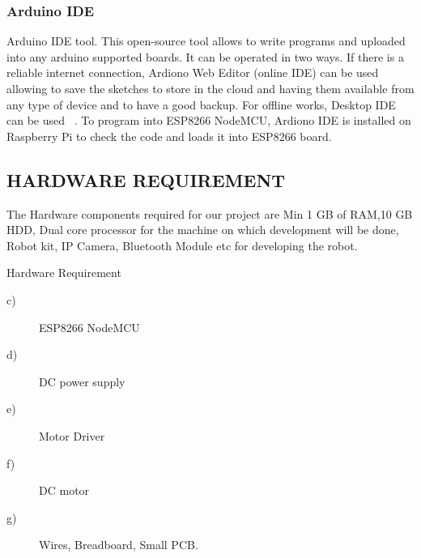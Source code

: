 \documentclass[sigconf]{acmart}
\begin{document}
\subsubsection{Arduino IDE}
Arduino IDE tool. This open-source tool allows to write programs and uploaded into any arduino supported boards. It can be operated in two ways. If there is a reliable internet connection, Ardiono Web Editor (online IDE) can be used allowing to save the sketches to store in the cloud and having them available from any type of device and to have a good backup. For offline works, Desktop IDE can be used ~\cite{arduino2015}. To program into ESP8266 NodeMCU, Ardiono IDE is installed on Raspberry Pi to check the code and loads it into ESP8266 board.

\subsection{HARDWARE REQUIREMENT}
The Hardware components required for our project are Min 1 GB of RAM,10 GB HDD, Dual core processor for the machine on which development will be done, Robot kit, IP Camera, Bluetooth Module etc for developing the robot.

Hardware Requirement
\begin{description}
\item[c)] ESP8266 NodeMCU
\item[d)] DC power supply
\item[e)] Motor Driver
\item[f)] DC motor
\item[g)] Wires, Breadboard, Small PCB.
\end{description}
\end{document}
